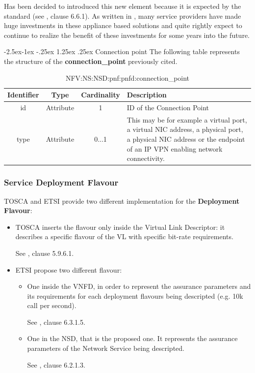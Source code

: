 \documentclass[11pt, english]{article}
\makeatletter
\renewcommand\paragraph{\@startsection{paragraph}{4}{\z@}%
            {-2.5ex\@plus -1ex \@minus -.25ex}%
            {1.25ex \@plus .25ex}%
            {\normalfont\normalsize\bfseries}}
\makeatother
\begin{document}
Has been decided to introduced this new element because it is expected by the standard (see \cite{etsi}, clause 6.6.1). As written in \cite{pnfd}, many service providers have made huge investments in these appliance based solutions and quite rightly expect to continue to realize the benefit of these investments for some years into the future.

\paragraph{Connection point}
The following table represents the structure of the \textbf{connection\_point} previously cited.

\begin{table}[ht]
    \centering
    \begin{tabular}{c|c|c|m{7cm}}
    \hline
    Identifier & Type & Cardinality & Description \\
    \hline
    \rowcolor{Gray}
    id & Attribute & 1 & ID of the Connection Point \\
    \hline
    type & Attribute & 0...1 & This may be for example a virtual port, a virtual NIC address, a physical port, a physical NIC address or the endpoint of an IP VPN enabling network connectivity. \\
    \hline
    \end{tabular}
    \caption{NFV:NS:NSD:pnf:pnfd:connection\_point} \label{tab:tab13}
\end{table}

\subsubsection{Service Deployment Flavour}
TOSCA and ETSI provide two different implementation for the \textbf{Deployment Flavour}:
\begin{itemize}
    \item TOSCA inserts the flavour only inside the Virtual Link Descriptor: it describes a specific flavour of the VL with specific bit-rate requirements.
    
    See \cite{tosca}, clause 5.9.6.1.
    \item ETSI propose two different flavour:
        \begin{itemize}
            \item One inside the VNFD, in order to represent the assurance parameters and its requirements for each deployment flavours being descripted (e.g. 10k call per second).
            
            See \cite{etsi}, clause 6.3.1.5.
            
            \item One in the NSD, that is the proposed one. It represents the assurance parameters of the Network Service being descripted.
            
            See \cite{etsi}, clause 6.2.1.3.
        \end{itemize}
\end{itemize}
\end{document}
